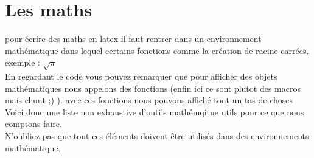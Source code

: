 \documentclass[fontsize=10pt]{article}
\begin{document}
\section{Les maths}
pour écrire des maths en latex il faut rentrer dans un environnement mathématique dans lequel certains fonctions comme la création de racine carrées. exemple : $\sqrt{\pi}$\\
En regardant le code vous pouvez remarquer que pour afficher des objets mathématiques nous appelons des fonctions.(enfin ici ce sont plutot des macros mais chuut ;) ). avec ces fonctions nous pouvons affiché tout un tas de choses\\
Voici donc une liste non exhaustive d'outils mathémqitue utils pour ce que nous comptons faire.\\
N'oubliez pas que tout ces éléments doivent être utilisés dans des environnements mathématique.
\end{document}
